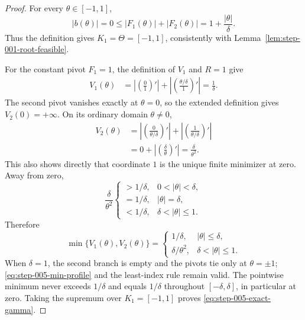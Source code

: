\begin{proof}
For every $\theta\in[-1,1]$,
\[
|b(\theta)|=0
\leq |F_1(\theta)|+|F_2(\theta)|
=1+\frac{|\theta|}{\delta}.
\]
Thus the definition gives $K_1=\Theta=[-1,1]$, consistently with
Lemma~\ref{lem:step-001-root-feasible}.

For the constant pivot $F_1=1$, the definition of $V_1$ and $R=1$ give
\[
\begin{aligned}
V_1(\theta)
&=\left|\left(\frac01\right)'\right|
 +\left|\left(\frac{\theta/\delta}{1}\right)'\right|
=\frac1\delta.
\end{aligned}
\]
The second pivot vanishes exactly at $\theta=0$, so the extended definition
gives $V_2(0)=+\infty$.  On its ordinary domain $\theta\neq0$,
\[
\begin{aligned}
V_2(\theta)
&=\left|\left(\frac0{\theta/\delta}\right)'\right|
 +\left|\left(\frac1{\theta/\delta}\right)'\right|\\
&=0+\left|\left(\frac\delta\theta\right)'\right|
=\frac\delta{\theta^2}.
\end{aligned}
\]
This also shows directly that coordinate $1$ is the unique finite minimizer
at zero.  Away from zero,
\[
\frac\delta{\theta^2}
\begin{cases}
>1/\delta,&0<|\theta|<\delta,\\
=1/\delta,&|\theta|=\delta,\\
<1/\delta,&\delta<|\theta|\leq1.
\end{cases}
\]
Therefore
\begin{equation}
\min\{V_1(\theta),V_2(\theta)\}
=
\begin{cases}
1/\delta,&|\theta|\leq\delta,\\
\delta/\theta^2,&\delta<|\theta|\leq1.
\end{cases}
\label{eq:step-005-min-profile}
\end{equation}
When $\delta=1$, the second branch is empty and the pivots tie only at
$\theta=\pm1$; \eqref{eq:step-005-min-profile} and the least-index rule
remain valid.  The pointwise minimum never exceeds $1/\delta$ and equals
$1/\delta$ throughout $[-\delta,\delta]$, in particular at zero.  Taking
the supremum over $K_1=[-1,1]$ proves
\eqref{eq:step-005-exact-gamma}.
\end{proof}

